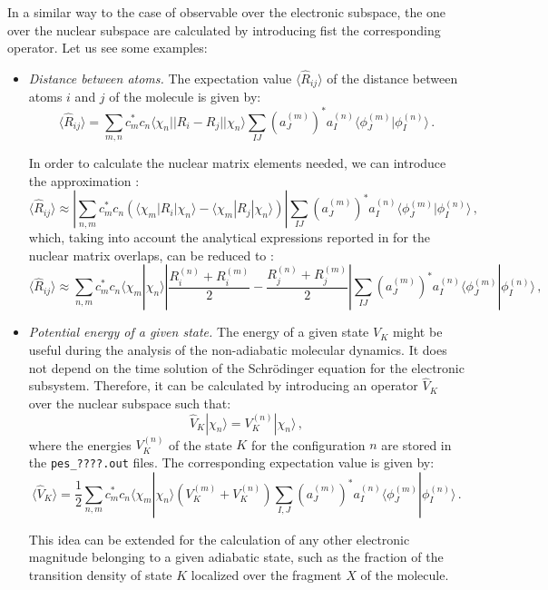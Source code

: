 In a similar way to the case of observable over the electronic subspace, the one over the nuclear subspace are calculated by introducing fist the corresponding operator. Let us see some examples:
\begin{itemize}
    \item \textit{Distance between atoms.} The expectation value $\langle\hat R_{ij}\rangle$ of the distance between atoms $i$ and $j$ of the molecule is given by:
    \begin{equation}
        \langle\hat R_{ij}\rangle = \sum_{m,n}c_m^*c_n\langle\chi_n||R_i-R_j||\chi_n\rangle\sum_{IJ}\left(a_J^{(m)}\right)^*a_I^{(n)}\langle\phi_J^{(m)}|\phi_I^{(n)}\rangle\,.
    \end{equation}
    
    In order to calculate the nuclear matrix elements needed, we can introduce the approximation \cite{freixas2018ab}:
    \begin{equation}
        \langle\hat R_{ij}\rangle \approx\left|\sum_{n,m}c_m^*c_n\left(\langle\chi_m|R_i|\chi_n\rangle-\langle\chi_m|R_j|\chi_n\rangle\right)\right|\sum_{IJ}\left(a_J^{(m)}\right)^*a_I^{(n)}\langle\phi_J^{(m)}|\phi_I^{(n)}\rangle\,,
    \end{equation}
    which, taking into account the analytical expressions reported in \cite{makhov2014ab} for the nuclear matrix overlaps, can be reduced to \cite{freixas2018ab}:
    \begin{equation}
        \langle\hat R_{ij}\rangle \approx\sum_{n,m}c_m^*c_n\langle\chi_m|\chi_n\rangle\left|\frac{R_i^{(n)}+R_i^{(m)}}{2}-\frac{R_j^{(n)}+R_j^{(m)}}{2}\right|\sum_{IJ}\left(a_J^{(m)}\right)^*a_I^{(n)}\langle\phi_J^{(m)}|\phi_I^{(n)}\rangle\,,
    \end{equation}
    
    \item \textit{Potential energy of a given state.} The energy of a given state $V_K$ might be useful during the analysis of the non-adiabatic molecular dynamics. It does not depend on the time solution of the Schrödinger equation for the electronic subsystem. Therefore, it can be calculated by introducing an operator $\hat V_K$ over the nuclear subspace such that:
    \begin{equation}
        \hat V_K|\chi_n\rangle = V_K^{(n)}|\chi_n\rangle\,,
    \end{equation}
    where the energies $V_K^{(n)}$ of the state $K$ for the configuration $n$ are stored in the \verb+pes_????.out+ files. The corresponding expectation value is given by:
    \begin{equation}
        \langle\hat V_K\rangle = \frac{1}{2}\sum_{n,m}c_m^*c_n\langle\chi_m|\chi_n\rangle\left(V_K^{(m)}+V_K^{(n)}\right)\sum_{I,J}\left(a_J^{(m)}\right)^*a_I^{(n)}\langle\phi_J^{(m)}|\phi_I^{(n)}\rangle\,.
    \end{equation}
    
    This idea can be extended for the calculation of any other electronic magnitude belonging to a given adiabatic state, such as the fraction of the transition density of state $K$ localized over the fragment $X$ of the molecule.
    
\end{itemize}
